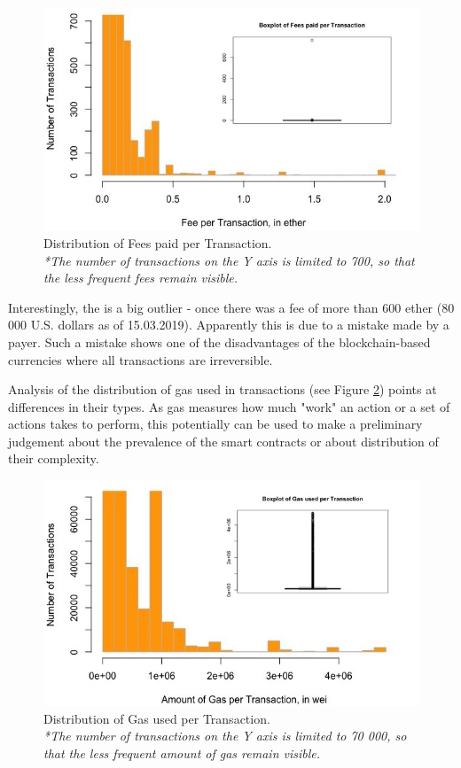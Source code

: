 \begin{figure}[h]
  \centering
  \includegraphics[width=\linewidth]{figures/fee_per_tx.jpeg}
  \caption{Distribution of Fees paid per Transaction.\\ 
  \textit{*The number of transactions on the Y axis is limited to 700, so that the less frequent fees remain visible.}}
  \label{fig:fee_per_tx}
\end{figure}

Interestingly, the is a big outlier - once there was a fee of more than 600 ether (80 000 U.S. dollars as of 15.03.2019).
Apparently this is due to a mistake made by a payer.
Such a mistake shows one of the disadvantages of the blockchain-based currencies where all transactions are irreversible.

Analysis of the distribution of gas used in transactions (see Figure \ref{fig:gas_per_tx}) points at differences in their types.
As gas measures how much "work" an action or a set of actions takes to perform, this potentially can be used to make a preliminary judgement about the prevalence of the smart contracts or about distribution of their complexity.

\begin{figure}[h]
  \centering
  \includegraphics[width=\linewidth]{figures/gas_per_tx.jpeg}
  \caption{Distribution of Gas used per Transaction. \\ 
  \textit{*The number of transactions on the Y axis is limited to 70 000, so that the less frequent amount of gas remain visible.}}
  \label{fig:gas_per_tx}
\end{figure}

